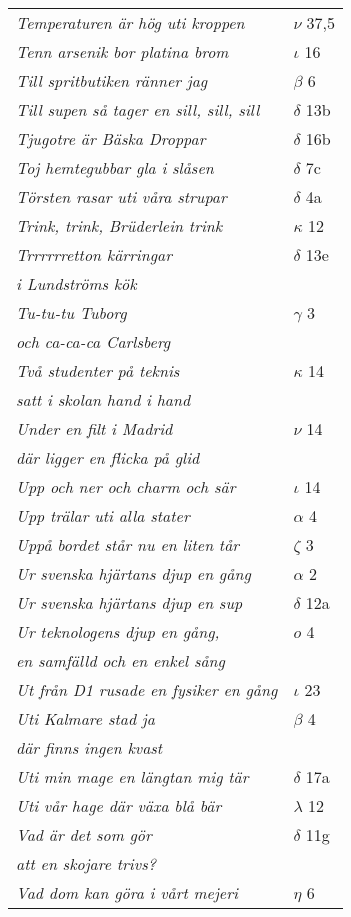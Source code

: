 \documentclass[a6paper,10pt]{article}
\begin{document}
\newpage
\setlength{\oddsidemargin}{-0.37in}
\begin{table}[!h]
\begin{tabular}{l l}
\textit{Temperaturen är hög uti kroppen}	&$\nu$ 37,5\\
\textit{Tenn arsenik bor platina brom}	&$\iota$ 16\\
\textit{Till spritbutiken ränner jag}	&$\beta$ 6\\
\textit{Till supen så tager en sill, sill, sill}	&$\delta$ 13b\\
\textit{Tjugotre är Bäska Droppar}	&$\delta$ 16b\\
\textit{Toj hemtegubbar gla i slåsen}	&$\delta$ 7c\\
\textit{Törsten rasar uti våra strupar}	&$\delta$ 4a\\
\textit{Trink, trink, Brüderlein trink}	&$\kappa$ 12\\
\textit{Trrrrrretton kärringar}	&$\delta$ 13e\\
\textit{i Lundströms kök} &\\
\textit{Tu-tu-tu Tuborg}	&$\gamma$ 3\\
\textit{och ca-ca-ca Carlsberg} &\\
\textit{Två studenter på teknis}	&$\kappa$ 14\\
\textit{satt i skolan hand i hand} &\\
\textit{Under en filt i Madrid}	&$\nu$ 14\\
\textit{där ligger en flicka på glid} &\\
\textit{Upp och ner och charm och sär}	&$\iota$ 14\\
\textit{Upp trälar uti alla stater}	&$\alpha$ 4\\
\textit{Uppå bordet står nu en liten tår}	&$\zeta$ 3\\
\textit{Ur svenska hjärtans djup en gång}	&$\alpha$ 2\\
\textit{Ur svenska hjärtans djup en sup}	&$\delta$ 12a\\
\textit{Ur teknologens djup en gång,}	&$o$ 4\\
\textit{en samfälld och en enkel sång} &\\
\textit{Ut från D1 rusade en fysiker en gång} &$\iota$ 23\\
\textit{Uti Kalmare stad ja}	&$\beta$ 4\\
\textit{där finns ingen kvast} &\\
\textit{Uti min mage en längtan mig tär}	&$\delta$ 17a\\
\textit{Uti vår hage där växa blå bär}	&$\lambda$ 12\\
\textit{Vad är det som gör}	&$\delta$ 11g\\
\textit{att en skojare trivs?} &\\
\textit{Vad dom kan göra i vårt mejeri}	&$\eta$ 6\\
\end{tabular}
\end{table}
\end{document}
